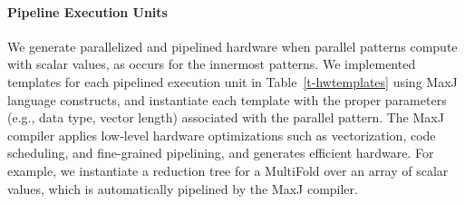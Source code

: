 


\paragraph{Pipeline Execution Units}
We generate parallelized and pipelined hardware when parallel patterns compute with scalar values,
as occurs for the innermost patterns.
We implemented templates for each
pipelined execution unit in Table~\ref{t-hwtemplates} using MaxJ language
constructs, and instantiate each template with the proper parameters (e.g., data type,
vector length) associated with the parallel pattern.  The MaxJ compiler
applies low-level hardware optimizations such as vectorization, code
scheduling, and fine-grained pipelining, and generates efficient hardware.  For
example, we instantiate a reduction tree for a MultiFold over an
array of scalar values, which is automatically pipelined by the MaxJ compiler.



